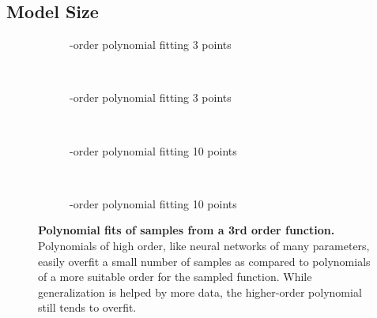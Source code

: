 \documentclass[thesis]{subfiles}
\begin{document}
	
    \subsection{Model Size}\label{modelsize}
	\begin{figure}[tbp]
		\centering
		\begin{subfigure}[t]{0.48\textwidth}
			\resizebox{\linewidth}{!}{}
			\caption{-order polynomial fitting 3 points}
			\label{fig:polyfit3rd}
		\end{subfigure}
		~
		\begin{subfigure}[t]{0.48\textwidth}
			\resizebox{\linewidth}{!}{}
			\caption{-order polynomial fitting 3 points}
			\label{fig:polyfit20th}
		\end{subfigure}\\	
		\begin{subfigure}[t]{0.48\textwidth}
			\resizebox{\linewidth}{!}{}
			\caption{-order polynomial fitting 10 points}
			\label{fig:polyfit3rdlots}
		\end{subfigure}
		~
		\begin{subfigure}[t]{0.48\textwidth}
			\resizebox{\linewidth}{!}{}
			\caption{-order polynomial fitting 10 points}
			\label{fig:polyfit20thlots}
		\end{subfigure}
		\caption[Polynomial fits of samples from a  order function]{\textbf{Polynomial fits of samples from a 3rd order function.} Polynomials of high order, like neural networks of many parameters, easily overfit a small number of samples as compared to polynomials of a more suitable order for the sampled function. While generalization is helped by more data, the higher-order polynomial still tends to overfit.}
		\label{fig:polyfits}
	\end{figure}
\end{document}

